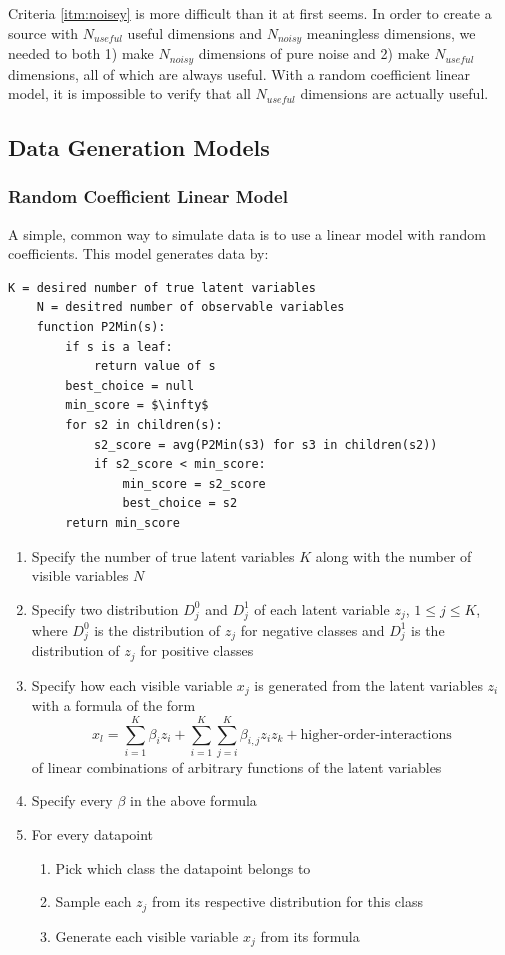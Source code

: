 \documentclass{article}
\begin{document}
Criteria \ref{itm:noisey} is more difficult than it at first seems. In
order to create a source with $N_{useful}$ useful dimensions and $N_{noisy}$
meaningless dimensions, we needed to both 1) make $N_{noisy}$ dimensions of
pure noise and 2) make $N_{useful}$ dimensions, all of which are always useful.
With a random coefficient linear model, it is impossible to verify that all
$N_{useful}$ dimensions are actually useful.



\subsection{Data Generation Models}

\subsubsection{Random Coefficient Linear Model}

A simple, common way to simulate data is to use a linear model with random
coefficients. This model generates data by:
\begin{lstlisting}[]
    K = desired number of true latent variables
    N = desitred number of observable variables
    function P2Min(s):
        if s is a leaf:
            return value of s
        best_choice = null
        min_score = $\infty$
        for s2 in children(s):
            s2_score = avg(P2Min(s3) for s3 in children(s2))
            if s2_score < min_score:
                min_score = s2_score
                best_choice = s2
        return min_score
\end{lstlisting}
\begin{enumerate}
    \item Specify the number of true latent variables $K$ along with the number
        of visible variables $N$
    \item Specify two distribution $D_j^0$ and $D_j^1$ of each latent variable
        $z_j$, $1 \leq j \leq K$, where $D_j^0$ is the distribution of $z_j$
        for negative classes and $D_j^1$ is the distribution of $z_j$ for
        positive classes
    \item Specify how each visible variable $x_j$ is generated from the latent
        variables $z_i$ with a formula of the form
        $$
        x_l
        = \sum_{i=1}^K \beta_i z_i
        + \sum_{i=1}^K\sum_{j=i}^K \beta_{i,j} z_i z_k
        + \text{higher-order-interactions}
        $$
        of linear combinations of arbitrary functions of the latent variables
    \item Specify every $\beta$ in the above formula
    \item For every datapoint
    \begin{enumerate}
        \item Pick which class the datapoint belongs to
        \item Sample each $z_j$ from its respective distribution for this class
        \item Generate each visible variable $x_j$ from its formula
    \end{enumerate}
\end{enumerate}
\end{document}
